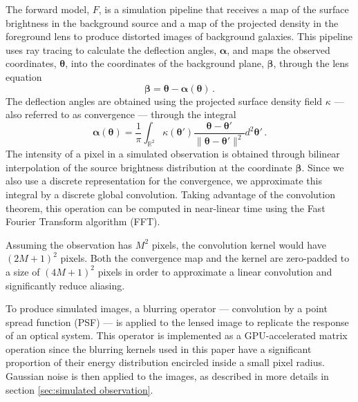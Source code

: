 The forward model, $F$, is a simulation pipeline that receives a map of the surface brightness in the background source and a map of the projected density in the foreground lens to produce distorted images of background galaxies.
This pipeline uses ray tracing to calculate the deflection angles, $\bm{\alpha}$, and maps the observed coordinates, $\bm{\theta}$, into the coordinates of the background plane, $\bm{\beta}$, through the lens equation
\begin{equation}\label{eq:LensEquation}
        \bm{\beta} = \bm{\theta} - \bm{\alpha}(\bm{\theta})\, .
\end{equation}
The deflection angles are obtained using the projected surface 
density field $\kappa$ --- also referred to as convergence --- through the integral
\begin{equation}\label{eq:alpha}
        \bm{\alpha}(\boldsymbol{\theta}) = 
        \frac{1}{\pi} \int_{\mathbb{R}^2}
        \kappa(\boldsymbol{\theta}') 
        \frac{\boldsymbol{\theta}
        - \boldsymbol{\theta}'}{\lVert \boldsymbol{\theta} - 
        \boldsymbol{\theta}' \rVert^2}
        d^2\boldsymbol{\theta}'\, .
\end{equation}
The intensity of a pixel in a simulated observation
is obtained through bilinear interpolation of the 
source brightness distribution at the coordinate $\boldsymbol{\beta}$.
Since we also use a discrete representation for the convergence, 
we approximate this integral by a discrete global convolution. Taking 
advantage of the convolution theorem, this operation 
can be computed in near-linear time using 
the Fast Fourier Transform algorithm (FFT). 

Assuming the observation 
has $M^2$ pixels, the convolution kernel %
would have $(2M + 1)^{2}$ pixels. 
Both the convergence map and the kernel are zero-padded 
to a size of $(4M+1)^{2}$ pixels in order to approximate a linear 
convolution and significantly reduce aliasing.

To produce simulated images, a blurring operator --- convolution by a point spread function (PSF) --- is 
applied to the lensed image to replicate the response of an optical system.
This operator is implemented as a GPU-accelerated matrix operation 
since the blurring kernels used in this paper have a significant proportion
of their energy distribution encircled inside a small pixel radius. Gaussian noise is then applied to the images, as described in more details in section \ref{sec:simulated observation}.


